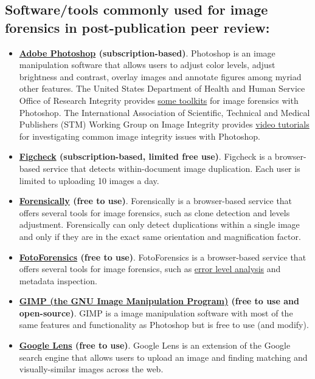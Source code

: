 \documentclass[letterpaper, 12pt]{article}
\begin{document}
\subsection*{Software/tools commonly used for image forensics in post-publication peer review:}

\begin{itemize}
    \setlength\itemsep{-0.5em}
    \item \textbf{\href{https://www.adobe.com/products/photoshop.html}{Adobe Photoshop} (subscription-based)}. Photoshop is an image manipulation software that allows users to adjust color levels, adjust brightness and contrast, overlay images and annotate figures among myriad other features. The United States Department of Health and Human Service Office of Research Integrity provides \href{https://ori.hhs.gov/advanced-forensic-actions}{some toolkits} for image forensics with Photoshop. The International Association of Scientific, Technical and Medical Publishers (STM) Working Group on Image Integrity provides \href{https://stm-assoc.org/what-we-do/strategic-areas/research-integrity/image-integrity/resource-center/}{video tutorials} for investigating common image integrity issues with Photoshop.
    \item \textbf{\href{https://www.figcheck.com/imagecheck}{Figcheck} (subscription-based, limited free use)}. Figcheck is a browser-based service that detects within-document image duplication. Each user is limited to uploading 10 images a day.
    \item \textbf{\href{https://29a.ch/photo-forensics/}{Forensically} (free to use)}. Forensically is a browser-based service that offers several tools for image forensics, such as clone detection and levels adjustment. Forensically can only detect duplications within a single image and only if they are in the exact same orientation and magnification factor.
    \item \textbf{\href{https://fotoforensics.com/}{FotoForensics} (free to use)}. FotoForensics is a browser-based service that offers several tools for image forensics, such as \href{https://en.wikipedia.org/wiki/Error_level_analysis}{error level analysis} and metadata inspection.
    \item \textbf{\href{https://www.gimp.org/}{GIMP (the GNU Image Manipulation Program)} (free to use and open-source)}. GIMP is a image manipulation software with most of the same features and functionality as Photoshop but is free to use (and modify).
    \item \textbf{\href{https://www.google.com/?olud=}{Google Lens} (free to use)}. Google Lens is an extension of the Google search engine that allows users to upload an image and finding matching and visually-similar images across the web.

\end{itemize}
\end{document}
